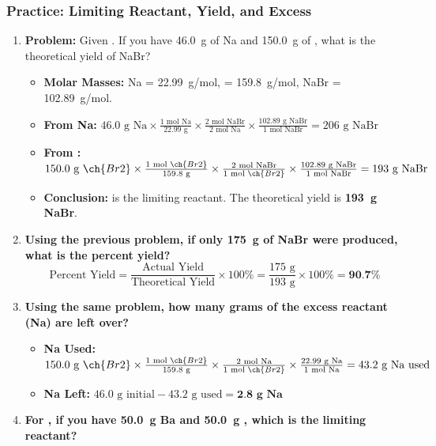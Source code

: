 \documentclass{article}
\begin{document}
\subsubsection*{Practice: Limiting Reactant, Yield, and Excess}
\begin{enumerate}[itemsep=5pt]
    \item \textbf{Problem:} Given . If you have \SI{46.0}{g} of Na and \SI{150.0}{g} of , what is the theoretical yield of NaBr?
    \begin{itemize}
        \item \textbf{Molar Masses:} Na = \SI{22.99}{g/mol},  = \SI{159.8}{g/mol}, NaBr = \SI{102.89}{g/mol}.
        \item \textbf{From Na:} \( 46.0 \text{ g Na} \times \frac{1 \text{ mol Na}}{22.99 \text{ g}} \times \frac{2 \text{ mol NaBr}}{2 \text{ mol Na}} \times \frac{102.89 \text{ g NaBr}}{1 \text{ mol NaBr}} = 206 \text{ g NaBr} \)
        \item \textbf{From :} \( 150.0 \text{ g } \ch{Br2} \times \frac{1 \text{ mol } \ch{Br2}}{159.8 \text{ g}} \times \frac{2 \text{ mol NaBr}}{1 \text{ mol } \ch{Br2}} \times \frac{102.89 \text{ g NaBr}}{1 \text{ mol NaBr}} = 193 \text{ g NaBr} \)
        \item \textbf{Conclusion:}  is the limiting reactant. The theoretical yield is \textbf{\SI{193}{g} NaBr}.
    \end{itemize}
    \item \textbf{Using the previous problem, if only \SI{175}{g} of NaBr were produced, what is the percent yield?}
    \[ \text{Percent Yield} = \frac{\text{Actual Yield}}{\text{Theoretical Yield}} \times 100\% = \frac{175 \text{ g}}{193 \text{ g}} \times 100\% = \textbf{90.7\%} \]
    \item \textbf{Using the same problem, how many grams of the excess reactant (Na) are left over?}
    \begin{itemize}
        \item \textbf{Na Used:} \( 150.0 \text{ g } \ch{Br2} \times \frac{1 \text{ mol } \ch{Br2}}{159.8 \text{ g}} \times \frac{2 \text{ mol Na}}{1 \text{ mol } \ch{Br2}} \times \frac{22.99 \text{ g Na}}{1 \text{ mol Na}} = 43.2 \text{ g Na used} \)
        \item \textbf{Na Left:} \( 46.0 \text{ g initial} - 43.2 \text{ g used} = \textbf{2.8 g Na} \)
    \end{itemize}
    \item \textbf{For , if you have \SI{50.0}{g} Ba and \SI{50.0}{g} , which is the limiting reactant?}

\end{enumerate}
\end{document}

